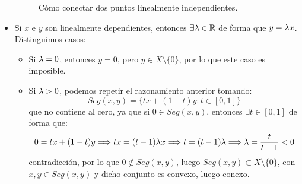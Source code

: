 \begin{ejercicio}
\begin{itemize}
\begin{figure}[H]
\begin{tikzpicture}[scale=2]
            \end{tikzpicture}
            \caption{Cómo conectar dos puntos linealmente independientes.}
        \end{figure}
    \item Si $x$ e $y$ son linealmente dependientes, entonces $\exists \lm \in \mathbb{R}$ de forma que $y = \lm x$. Distinguimos casos:
        \begin{itemize}
            \item Si $\lm = 0$, entonces $y = 0$, pero $y \in X\setminus \{0\}$, por lo que este caso es imposible.
            \item Si $\lm > 0$, podemos repetir el razonamiento anterior tomando:
                \begin{equation*}
                    Seg(x,y) = \{tx + (1-t)y : t \in [0,1]\}
                \end{equation*}
                que no contiene al cero, ya que si $0\in Seg(x,y)$, entonces $\exists t\in [0,1]$ de forma que:
                \begin{equation*}
                    0 = tx + (1-t)y \Longrightarrow  tx = (t-1)\lm x \Longrightarrow t = (t-1)\lm \Longrightarrow \lm = \dfrac{t}{t-1} < 0
                \end{equation*}
                contradicción, por lo que $0 \notin Seg(x,y)$, luego $Seg(x,y) \subset X\setminus \{0\}$, con $x,y\in Seg(x,y)$ y dicho conjunto es convexo, luego conexo.
        \begin{figure}[H]
            \centering
\end{figure}
\end{itemize}
\end{itemize}
\end{ejercicio}
